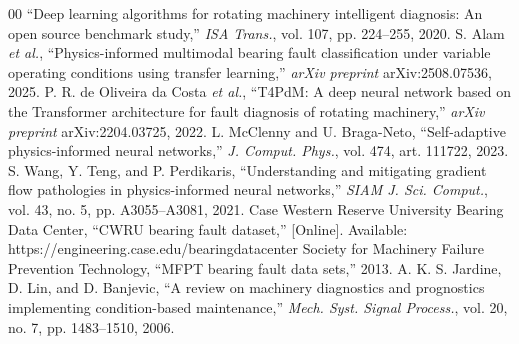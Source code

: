 \documentclass[conference]{IEEEtran}
\begin{document}
\begin{thebibliography}{00}
``Deep learning algorithms for rotating machinery intelligent diagnosis: An
open source benchmark study,'' \textit{ISA Trans.}, vol. 107, pp. 224--255, 2020.
 S. Alam \textit{et al.}, ``Physics-informed multimodal bearing
fault classification under variable operating conditions using transfer
learning,'' \textit{arXiv preprint} arXiv:2508.07536, 2025.
 P. R. de Oliveira da Costa \textit{et al.}, ``T4PdM: A deep
neural network based on the Transformer architecture for fault diagnosis of
rotating machinery,'' \textit{arXiv preprint} arXiv:2204.03725, 2022.
 L. McClenny and U. Braga-Neto, ``Self-adaptive
physics-informed neural networks,'' \textit{J. Comput. Phys.}, vol. 474, art.
111722, 2023.
 S. Wang, Y. Teng, and P. Perdikaris, ``Understanding and
mitigating gradient flow pathologies in physics-informed neural networks,''
\textit{SIAM J. Sci. Comput.}, vol. 43, no. 5, pp. A3055--A3081, 2021.
 Case Western Reserve University Bearing Data Center, ``CWRU
bearing fault dataset,'' [Online]. Available:
https://engineering.case.edu/bearingdatacenter
 Society for Machinery Failure Prevention Technology, ``MFPT
bearing fault data sets,'' 2013.
 A. K. S. Jardine, D. Lin, and D. Banjevic, ``A review on
machinery diagnostics and prognostics implementing condition-based
maintenance,'' \textit{Mech. Syst. Signal Process.}, vol. 20, no. 7, pp.
1483--1510, 2006.
\end{thebibliography}
\end{document}
